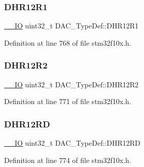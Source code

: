 \mbox{\label{struct_d_a_c___type_def_afbfd2855cdb81939b4efc58e08aaf3e5}} 
\subsubsection{\texorpdfstring{D\+H\+R12\+R1}{DHR12R1}}
{\footnotesize\ttfamily \hyperlink{core__sc300_8h_aec43007d9998a0a0e01faede4133d6be}{\+\_\+\+\_\+\+IO} uint32\+\_\+t D\+A\+C\+\_\+\+Type\+Def\+::\+D\+H\+R12\+R1}



Definition at line 768 of file stm32f10x.\+h.

\mbox{\label{struct_d_a_c___type_def_ab1f777540c487c26bf27e6fa37a644cc}} 
\subsubsection{\texorpdfstring{D\+H\+R12\+R2}{DHR12R2}}
{\footnotesize\ttfamily \hyperlink{core__sc300_8h_aec43007d9998a0a0e01faede4133d6be}{\+\_\+\+\_\+\+IO} uint32\+\_\+t D\+A\+C\+\_\+\+Type\+Def\+::\+D\+H\+R12\+R2}



Definition at line 771 of file stm32f10x.\+h.

\mbox{\label{struct_d_a_c___type_def_affa5cc9fe0cc9eb594d703bdc9d9abd9}} 
\subsubsection{\texorpdfstring{D\+H\+R12\+RD}{DHR12RD}}
{\footnotesize\ttfamily \hyperlink{core__sc300_8h_aec43007d9998a0a0e01faede4133d6be}{\+\_\+\+\_\+\+IO} uint32\+\_\+t D\+A\+C\+\_\+\+Type\+Def\+::\+D\+H\+R12\+RD}



Definition at line 774 of file stm32f10x.\+h.

